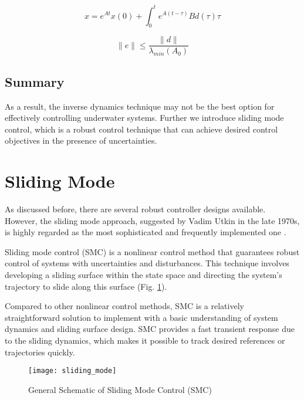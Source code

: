     \begin{equation}
        x = e^{At}x(0) + \int_0^t e^{A(t - \tau)}Bd(\tau)\tau
    \end{equation}

    \begin{equation}
        \|e\| \leq \frac{\|d\|}{\lambda_{min}(A_0)}
    \end{equation}

    \subsection{Summary}


    As a result, the inverse dynamics technique may not be the best option for effectively 
    controlling underwater systems. Further we introduce sliding mode control, which is a robust 
    control technique that can achieve desired control objectives in the presence of uncertainties.

\section{Sliding Mode}

    As discussed before, there are several robust controller
    designs available. However, the sliding mode approach, suggested by Vadim 
    Utkin in the late 1970s, is highly regarded as the most sophisticated and 
    frequently implemented one \cite{utkin}.

    Sliding mode control (SMC) is a nonlinear control method that guarantees
    robust control of systems with uncertainties and disturbances.
    This technique involves developing a sliding surface within the state
    space and directing the system's trajectory to slide along this surface (Fig. \ref{image:sliding_mode}).
    
    Compared to other nonlinear control methods, SMC is a relatively straightforward
    solution to implement with a basic understanding of system dynamics and sliding
    surface design. SMC provides a fast transient response due to the sliding dynamics, which makes 
    it possible to track desired references or trajectories quickly.

    \begin{figure}[H]
        \centering\texttt{[image: sliding\_mode]}
        \caption{General Schematic of Sliding Mode Control (SMC)}
        \label{image:sliding_mode}
    \end{figure}


